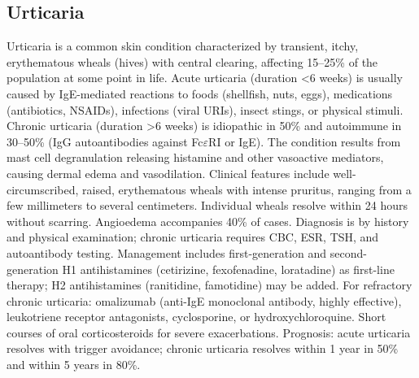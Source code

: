 \subsection{Urticaria}
\label{sec:Urticaria}
Urticaria is a common skin condition characterized by transient, itchy, erythematous wheals (hives) with central clearing, affecting 15--25\% of the population at some point in life. Acute urticaria (duration <6 weeks) is usually caused by IgE-mediated reactions to foods (shellfish, nuts, eggs), medications (antibiotics, NSAIDs), infections (viral URIs), insect stings, or physical stimuli. Chronic urticaria (duration >6 weeks) is idiopathic in 50\% and autoimmune in 30--50\% (IgG autoantibodies against Fc$\varepsilon$RI or IgE). The condition results from mast cell degranulation releasing histamine and other vasoactive mediators, causing dermal edema and vasodilation. Clinical features include well-circumscribed, raised, erythematous wheals with intense pruritus, ranging from a few millimeters to several centimeters. Individual wheals resolve within 24 hours without scarring. Angioedema accompanies 40\% of cases. Diagnosis is by history and physical examination; chronic urticaria requires CBC, ESR, TSH, and autoantibody testing. Management includes first-generation and second-generation H1 antihistamines (cetirizine, fexofenadine, loratadine) as first-line therapy; H2 antihistamines (ranitidine, famotidine) may be added. For refractory chronic urticaria: omalizumab (anti-IgE monoclonal antibody, highly effective), leukotriene receptor antagonists, cyclosporine, or hydroxychloroquine. Short courses of oral corticosteroids for severe exacerbations. Prognosis: acute urticaria resolves with trigger avoidance; chronic urticaria resolves within 1 year in 50\% and within 5 years in 80\%.


